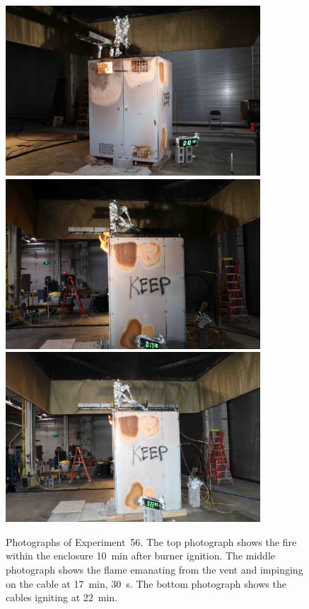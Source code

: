 \begin{figure}[p]
\centering
\includegraphics[height=2.50in]{../FIGURES/Test_56_10_min_13_s} \\
\includegraphics[height=2.50in]{../FIGURES/Test_56_17_min_30_s} \\
\includegraphics[height=2.50in]{../FIGURES/Test_56_22_min_5_s}
\caption[Photographs of Experiment~56]{Photographs of Experiment~56. The top photograph shows the fire within the enclosure 10~min after burner ignition. The middle photograph shows the flame emanating from the vent and impinging on the cable at 17~min, 30~s. The bottom photograph shows the cables igniting at 22~min.}
\label{fig:Test_56_photos}
\end{figure}


